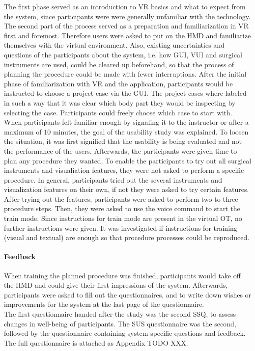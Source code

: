 The first phase served as an introduction to VR basics and what to expect from the system, since participants were were generally unfamiliar with the technology.
The second part of the process served as a preparation and familiarization in VR first and foremost.
Therefore users were asked to put on the HMD and familiarize themselves with the virtual environment.
Also, existing uncertainties and questions of the participants about the system, i.e. how GUI, VUI and surgical instruments are used, could be cleared up beforehand, so that the process of planning the procedure could be made with fewer interruptions.
After the initial phase of familiarization with VR and the application, participants would be instructed to choose a project case via the GUI.
The project cases where labeled in such a way that it was clear which body part they would be inspecting by selecting the case.
Participants could freely choose which case to start with.
\\ When participants felt familiar enough by signaling it to the instructor or after a maximum of 10 minutes, the goal of the usability study was explained.
To loosen the situation, it was first signified that the usability is being evaluated and not the performance of the users.
Afterwards, the participants were given time to plan any procedure they wanted.
To enable the participants to try out all surgical instruments and visualiation features, they were not asked to perform a specific procedure.
In general, participants tried out the several instruments and visualization features on their own, if not they were asked to try certain features.
After trying out the features, participants were asked to perform two to three procedure steps.
Then, they were asked to use the voice command to start the train mode.
Since instructions for train mode are present in the virtual OT, no further instructions were given.
It was investigated if instructions for training (visual and textual) are enough so that procedure processes could be reproduced.

\paragraph{\textbf{Feedback}}

When training the planned procedure was finished, participants would take off the HMD and could give their first impressions of the system.
Afterwards, participants were asked to fill out the questionnaires, and to write down wishes or improvements for the system at the last page of the questionnaire.
\\ The first questionnaire handed after the study was the second SSQ, to assess changes in well-being of participants.
The SUS questionnaire was the second, followed by the questionnaire containing system specific questions and feedback.
The full questionnaire is attached as Appendix TODO XXX.

